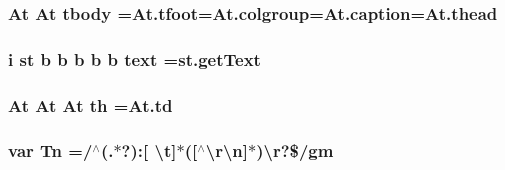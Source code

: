 \hypertarget{jquery-1_89_81_8min_8js_ac84f503a71898213f4c6b5e1dd5c6abd}{
\subsubsection[{tbody}]{\setlength{\rightskip}{0pt plus 5cm}At At tbody =At.\-tfoot=At.\-colgroup=At.\-caption=At.\-thead}}\label{jquery-1_89_81_8min_8js_ac84f503a71898213f4c6b5e1dd5c6abd}
\hypertarget{jquery-1_89_81_8min_8js_a854119a448e4d7458c60a3f890333d5e}{
\subsubsection[{text}]{ {\bf i} {\bf st} {\bf b} {\bf b} {\bf b} {\bf b} {\bf b} text =st.\-get\-Text}}\label{jquery-1_89_81_8min_8js_a854119a448e4d7458c60a3f890333d5e}
\hypertarget{jquery-1_89_81_8min_8js_aeedea77631091b57aa0040f4f86fd680}{
\subsubsection[{th}]{\setlength{\rightskip}{0pt plus 5cm}At At At th =At.\-td}}\label{jquery-1_89_81_8min_8js_aeedea77631091b57aa0040f4f86fd680}
\hypertarget{jquery-1_89_81_8min_8js_a2a743fa90b7bc233019c5b720ccde5cc}{
\subsubsection[{Tn}]{\setlength{\rightskip}{0pt plus 5cm}var Tn =/$^\wedge$(.$\ast$?)\-:\mbox{[} \textbackslash{}{\bf t}\mbox{]}$\ast$(\mbox{[}$^\wedge$\textbackslash{}{\bf r\textbackslash{}n}\mbox{]}$\ast$)\textbackslash{}{\bf r}?\$/gm}}\label{jquery-1_89_81_8min_8js_a2a743fa90b7bc233019c5b720ccde5cc}
